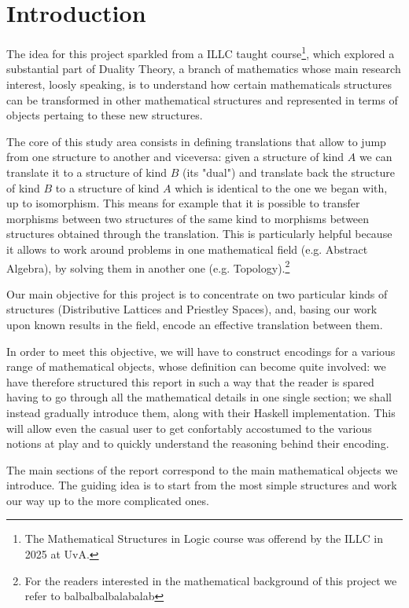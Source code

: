 %

%

\section{Introduction}

The idea for this project sparkled from a ILLC taught course\footnote{The Mathematical Structures in Logic course was offerend by the ILLC in 2025 at UvA.}, which explored a substantial part of Duality Theory, a branch of mathematics whose main research interest, loosly speaking, is to understand how certain mathematicals structures can be  transformed in other mathematical structures and represented in terms of objects pertaing to these new structures. 

The core of this study area consists in defining translations that allow to jump from one structure to another and viceversa: given a structure of kind $A$ we can translate it to a structure of kind $B$ (its "dual") and translate back the structure of kind $B$ to a structure of kind $A$ which is identical to the one we began with, up to isomorphism. This means for example that it is possible to transfer morphisms between two structures of the same kind to morphisms between structures obtained through the translation. This is particularly helpful because it allows to work around problems in one mathematical field  (e.g. Abstract Algebra), by solving them in another one (e.g. Topology).\footnote{For the readers interested in the mathematical background of this project we refer to balbalbalbalabalab}

Our main objective for this project is to concentrate on two particular kinds of structures (Distributive Lattices and Priestley Spaces), and, basing our work upon known results in the field, encode an effective translation between them.

In order to meet this objective, we will have to construct encodings for a various range of mathematical objects, whose definition can become quite involved: we have therefore structured this report in such a way that the reader is spared having to go through all the mathematical details in one single section; we shall instead gradually introduce them, along with their Haskell implementation. This will allow even the casual user to get confortably accostumed to the various notions at play and to quickly understand the reasoning behind their encoding.

The main sections of the report correspond to the main mathematical objects we introduce. The guiding idea is to start from the most simple structures and work our way up to the more complicated ones. 

